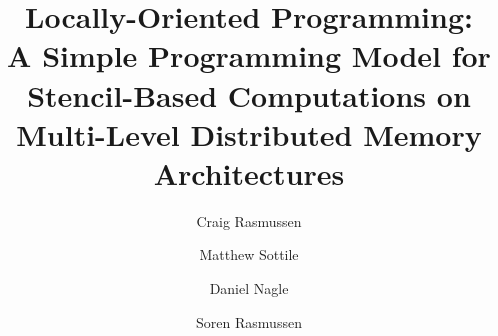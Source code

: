 \documentclass[runningheads,a4paper]{llncs}
\begin{document}
\mainmatter  %

\title{Locally-Oriented Programming:\\ A Simple Programming Model for Stencil-Based Computations
       on Multi-Level Distributed Memory Architectures}


\author{Craig Rasmussen
\and Matthew Sottile\and Daniel Nagle\and Soren Rasmussen}



%
%

\maketitle
\end{document}
